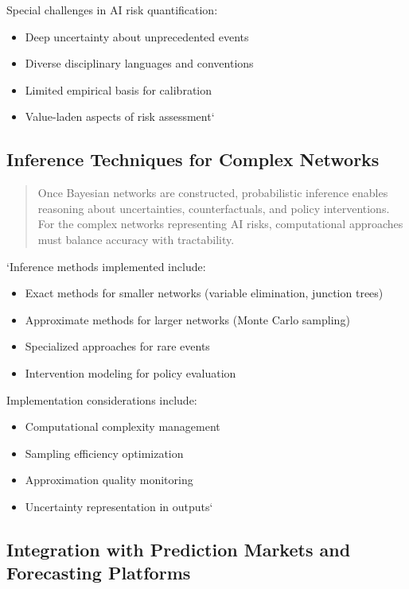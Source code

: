 \documentclass[]{book}
\providecommand{\tightlist}{%
  \setlength{\itemsep}{0pt}\setlength{\parskip}{0pt}}
\begin{document}
Special challenges in AI risk quantification:

\begin{itemize}
\tightlist
\item
  Deep uncertainty about unprecedented events
\item
  Diverse disciplinary languages and conventions
\item
  Limited empirical basis for calibration
\item
  Value-laden aspects of risk assessment`
\end{itemize}

\subsection{Inference Techniques for Complex
Networks}\label{sec-inference-techniques}

\begin{quote}
Once Bayesian networks are constructed, probabilistic inference enables
reasoning about uncertainties, counterfactuals, and policy
interventions. For the complex networks representing AI risks,
computational approaches must balance accuracy with tractability.
\end{quote}

`Inference methods implemented include:

\begin{itemize}
\tightlist
\item
  Exact methods for smaller networks (variable elimination, junction
  trees)
\item
  Approximate methods for larger networks (Monte Carlo sampling)
\item
  Specialized approaches for rare events
\item
  Intervention modeling for policy evaluation
\end{itemize}

Implementation considerations include:

\begin{itemize}
\tightlist
\item
  Computational complexity management
\item
  Sampling efficiency optimization
\item
  Approximation quality monitoring
\item
  Uncertainty representation in outputs`
\end{itemize}

\subsection{Integration with Prediction Markets and Forecasting
Platforms}\label{sec-prediction-markets}
\end{document}
